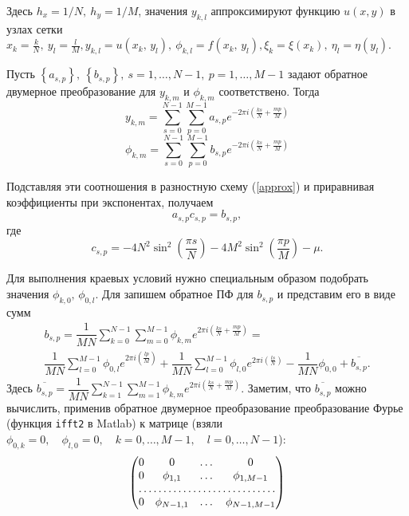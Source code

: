 \documentclass[12pt, a4paper]{article} %
\begin{document}
Здесь $h_x = 1/N, \ h_y = 1/M$, значения $y_{k,l}$ аппроксимируют функцию $u(x,y)$ в узлах сетки \\$x_k = \frac{k}{N},\ y_l = \frac{l}{M}, 
y_{k,l} = u\left(x_k, \, y_l\right),\ \phi_{k,l} = f\left(x_k, \, y_l\right),
\xi_k = \xi\left(x_k\right),\ \eta_l = \eta\left(y_l\right).$

Пусть $\left\{a_{s,p}\right\}, \ \left\{b_{s,p}\right\}, \ s = 1,\ldots,N-1, \ p = 1,\ldots,M-1$ задают обратное двумерное преобразование для $y_{k,m}$ и $\phi_{k,m}$ соответствено. Тогда 
$$ y_{k,m}=\sum_{s=0}^{N-1}\sum_{p=0}^{M-1}a_{s,p}e^{-2\pi i \left(\frac{ks}{N} + \frac{mp}{M}\right)}$$
$$ \phi_{k,m}=\sum_{s=0}^{N-1}\sum_{p=0}^{M-1}b_{s,p}e^{-2\pi i \left(\frac{ks}{N} + \frac{mp}{M}\right)}$$

Подставляя эти соотношения в разностную схему (\ref{approx}) и приравнивая коэффициенты при экспонентах, получаем
\begin{equation}
a_{s,p}c_{s,p}= b_{s,p}, \label{ac=b}
\end{equation}
где $$c_{s,p} = -4N^2\sin^2\left(\frac{\pi s}{N}\right)-4M^2\sin^2\left(\frac{\pi p}{M}\right) - \mu.$$

Для выполнения краевых условий нужно специальным образом подобрать значения $\phi_{k,0}, \, \phi_{0,l}$. Для запишем обратное ПФ для
$b_{s,p}$  и представим его в виде сумм
\begin{multline} 
b_{s,p}=\dfrac{1}{MN}\sum_{k=0}^{N-1}\sum_{m=0}^{M-1}\phi_{k,m}e^{2\pi i \left(\frac{ks}{N} + \frac{mp}{M}\right)}= \\
\dfrac{1}{MN}\sum_{l=0}^{M-1}\phi_{0,l}e^{2\pi i \left(\frac{lp}{M}\right)} + 
\dfrac{1}{MN}\sum_{l=0}^{M-1}\phi_{l,0}e^{2\pi i \left(\frac{ls}{N}\right)} - \dfrac{1}{MN}\phi_{0,0} + \overline{b_{s,p}}.\label{b}
\end{multline}
Здесь $\overline{b_{s,p}} = \dfrac{1}{MN}\sum\limits_{k=1}^{N-1}\sum\limits_{m=1}^{M-1}\phi_{k,m}e^{2\pi i \left(\frac{ks}{N} + \frac{mp}{M}\right)}$.
Заметим, что $\overline{b_{s,p}}$ можно вычислить, применив обратное двумерное преобразование преобразование Фурье (функция \texttt{ifft2} в Matlab) к матрице (взяли $\phi_{0,k} = 0, \quad \phi_{l, 0} = 0, \quad k = 0,\ldots,M-1, \quad l = 0,\ldots,N-1$):
\[ 
\begin{pmatrix}
  0 & 0 & \dots & 0 \\
  0 & \phi_{1,1} & \dots & \phi_{1,M-1} \\
  \hdotsfor{4} \\
  0 & \phi_{N-1,1} & \dots & \phi_{N-1, M-1}
\end{pmatrix}
\]
\end{document}
